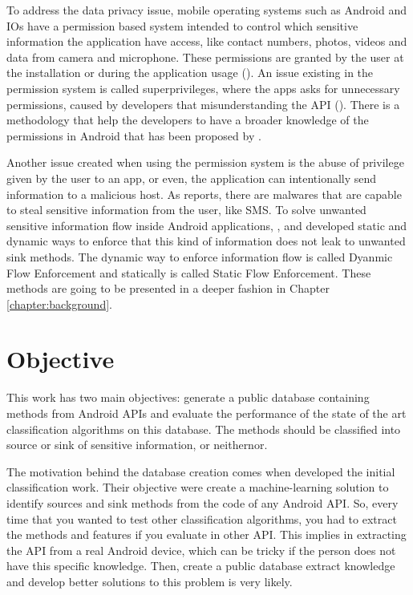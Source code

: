 To address the data privacy issue, mobile operating systems such as Android and IOs have a permission based system intended to control which sensitive information the application have access, like contact numbers, photos, videos and data from camera and microphone. These permissions are granted by the user at the installation or during the application usage (\cite{androidpermissions}). An issue existing in the permission system is called superprivileges, where the apps asks for unnecessary permissions, caused by developers that misunderstanding the API (\cite{felt2011android}). There is a methodology that help the developers to have a broader knowledge of the permissions in Android that has been proposed by \cite{barrera2010methodology}.

Another issue created when using the permission system is the abuse of privilege given by the user to an app, or even, the application can intentionally send information to a malicious host. As \cite{jiang2012dissecting} reports, there are malwares that are capable to steal sensitive information from the user, like SMS. To solve unwanted sensitive information flow inside Android applications, \cite{arzt2014flowdroid}, \cite{wei2014amandroid} and \cite{gordon2015information} developed static and dynamic ways to enforce that this kind of information does not leak to unwanted sink methods. The dynamic way to enforce information flow is called Dyanmic Flow Enforcement and statically is called Static Flow Enforcement. These methods are going to be presented in a deeper fashion in Chapter \ref{chapter:background}.


\section{Objective}\label{section:background}

This work has two main objectives: generate a public database containing methods from Android APIs and evaluate the performance of the state of the art classification algorithms on this database. The methods should be classified into source or sink of sensitive information, or neithernor.

The motivation behind the database creation comes when \cite{rasthofer2014machine} developed the initial classification work. Their objective were create a machine-learning solution to identify sources and sink methods from the code of any Android API. So, every time that you wanted to test other classification algorithms, you had to extract the methods and features if you evaluate in other API. This implies in extracting the API from a real Android device, which can be tricky if the person does not have this specific knowledge. Then, create a public database extract knowledge and develop better solutions to this problem is very likely.

